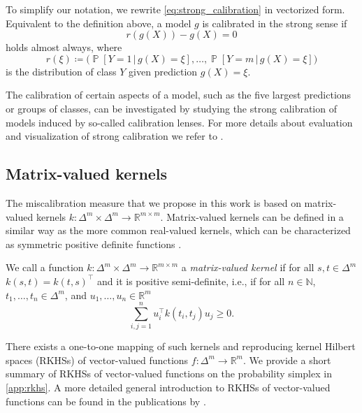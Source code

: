 \documentclass{article}
\DeclareMathOperator{\Prob}{\mathbb{P}}
\newcommand{\given}{\,|\,}
\begin{document}
To simplify our notation, we rewrite \cref{eq:strong_calibration} in vectorized
form. Equivalent to the definition above, a model $g$ is calibrated in the
strong sense if
\begin{equation}\label{eq:strong_calibration_vector}
  r(g(X)) - g(X) = 0
\end{equation}
holds almost always, where
\begin{equation*}
  r(\xi) \coloneqq \big(\Prob[Y = 1 \given g(X) = \xi], \ldots, \Prob[Y = m \given g(X) = \xi]\big)
\end{equation*}
is the distribution of class $Y$ given prediction $g(X) = \xi$.

The calibration of certain aspects of a model, such as the five largest
predictions or groups of classes, can be investigated by studying the
strong calibration of models induced by so-called calibration lenses. For more
details about evaluation and visualization of strong calibration we refer to
\citet{vaicenavicius19_evaluat}.

\subsection{Matrix-valued kernels}

The miscalibration measure that we propose in this work is based on
matrix-valued kernels $k \colon \Delta^m \times \Delta^m \to \mathbb{R}^{m \times m}$.
Matrix-valued kernels can be defined in a similar way as the more common
real-valued kernels, which can be characterized as symmetric positive definite
functions \citep[Lemma~4]{berlinet04_reprod_kernel_hilber_spaces_probab_statis}.

\begin{definition}\label{def:kernel}
  We call a function $k \colon \Delta^m \times \Delta^m \to \mathbb{R}^{m \times m}$
  a \emph{matrix-valued kernel} if for all $s, t \in \Delta^m$
  $k(s,t) = k(t,s)^\intercal$ and it is positive semi-definite, i.e., if for all
  $n \in \mathbb{N}$, $t_1,\ldots,t_n \in \Delta^m$, and $u_1, \ldots, u_n \in \mathbb{R}^m$
  \begin{equation*}
    \sum_{i,j=1}^n u_i^\intercal k(t_i, t_j) u_j \geq 0.
  \end{equation*}
\end{definition}

There exists a one-to-one mapping of such kernels and reproducing kernel Hilbert
spaces (RKHSs) of vector-valued functions $f \colon \Delta^m \to \mathbb{R}^m$.
We provide a short summary of RKHSs of vector-valued functions on the probability
simplex in \cref{app:rkhs}. A more detailed general introduction to RKHSs of
vector-valued functions can be found in the publications by
\citet{micchelli05_learn_vector_valued_funct,carmeli10_vector_valued_reprod_kernel_hilber_spaces_univer,caponnetto08_univer_multi_task_kernel}.
\end{document}
